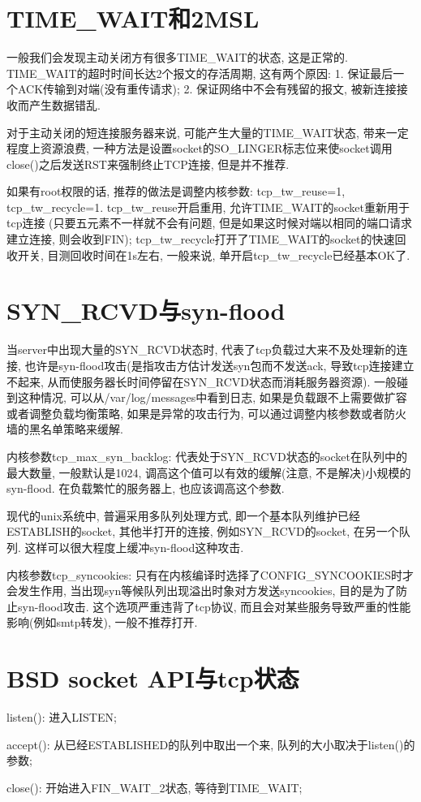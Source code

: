 \section {\ZHH TIME\_WAIT和2MSL} {
    {一般我们会发现主动关闭方有很多TIME\_WAIT的状态, 这是正常的. TIME\_WAIT的超时时间长达2个报文的存活周期, 这有两个原因: 1. 保证最后一个ACK传输到对端(没有重传请求); 2. 保证网络中不会有残留的报文, 被新连接接收而产生数据错乱. }\par
    {对于主动关闭的短连接服务器来说, 可能产生大量的TIME\_WAIT状态, 带来一定程度上资源浪费, 一种方法是设置socket的SO\_LINGER标志位来使socket调用close()之后发送RST来强制终止TCP连接, 但是并不推荐. }\par
    {如果有root权限的话, 推荐的做法是调整内核参数: tcp\_tw\_reuse=1, tcp\_tw\_recycle=1. tcp\_tw\_reuse开启重用, 允许TIME\_WAIT的socket重新用于tcp连接 (只要五元素不一样就不会有问题, 但是如果这时候对端以相同的端口请求建立连接, 则会收到FIN); tcp\_tw\_recycle打开了TIME\_WAIT的socket的快速回收开关, 目测回收时间在1s左右, 一般来说, 单开启tcp\_tw\_recycle已经基本OK了. } \par
}

\section {\ZHH SYN\_RCVD与syn-flood} {
    {当server中出现大量的SYN\_RCVD状态时, 代表了tcp负载过大来不及处理新的连接, 也许是syn-flood攻击(是指攻击方估计发送syn包而不发送ack, 导致tcp连接建立不起来, 从而使服务器长时间停留在SYN\_RCVD状态而消耗服务器资源). 一般碰到这种情况, 可以从/var/log/messages中看到日志, 如果是负载跟不上需要做扩容或者调整负载均衡策略, 如果是异常的攻击行为, 可以通过调整内核参数或者防火墙的黑名单策略来缓解. } \par
    {内核参数tcp\_max\_syn\_backlog: 代表处于SYN\_RCVD状态的socket在队列中的最大数量, 一般默认是1024, 调高这个值可以有效的缓解(注意, 不是解决)小规模的syn-flood. 在负载繁忙的服务器上, 也应该调高这个参数. }\par
    {现代的unix系统中, 普遍采用多队列处理方式, 即一个基本队列维护已经ESTABLISH的socket, 其他半打开的连接, 例如SYN\_RCVD的socket, 在另一个队列. 这样可以很大程度上缓冲syn-flood这种攻击. }\par
    {内核参数tcp\_syncookies: 只有在内核编译时选择了CONFIG\_SYNCOOKIES时才会发生作用, 当出现syn等候队列出现溢出时象对方发送syncookies, 目的是为了防止syn-flood攻击. 这个选项严重违背了tcp协议, 而且会对某些服务导致严重的性能影响(例如smtp转发), 一般不推荐打开. }\par
}

\section {\ZHH BSD socket API与tcp状态} {
    {listen(): 进入LISTEN;}\par
    {accept(): 从已经ESTABLISHED的队列中取出一个来, 队列的大小取决于listen()的参数; }\par
    {close(): 开始进入FIN\_WAIT\_2状态, 等待到TIME\_WAIT; }\par
}


